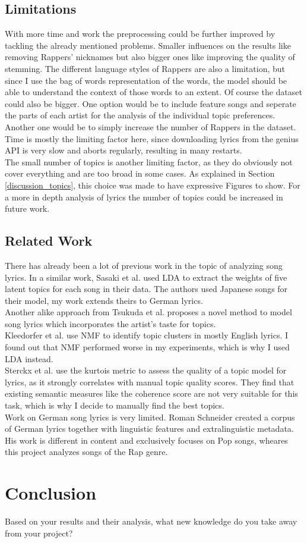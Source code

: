\documentclass[conference]{IEEEtran}
\begin{document}
\subsection{Limitations}
With more time and work the preprocessing could be further improved by tackling the already mentioned problems. Smaller influences on the results like removing Rappers' nicknames but also bigger ones like improving the quality of stemming. The different language styles of Rappers are also a limitation, but since I use the bag of words representation of the words, the model should be able to understand the context of those words to an extent. Of course the dataset could also be bigger. One option would be to include feature songs and seperate the parts of each artist for the analysis of the individual topic preferences. Another one would be to simply increase the number of Rappers in the dataset. Time is mostly the limiting factor here, since downloading lyrics from the genius API is very slow and aborts regularly, resulting in many restarts.\\
The small number of topics is another limiting factor, as they do obviously not cover everything and are too broad in some cases. As explained in Section \ref{discussion_topics}, this choice was made to have expressive Figures to show. For a more in depth analysis of lyrics the number of topics could be increased in future work.

\subsection{Related Work}
There has already been a lot of previous work in the topic of analyzing song lyrics. In a similar work, Sasaki et al. \cite{sasaki} used LDA to extract the weights of five latent topics for each song in their data. The authors used Japanese songs for their model, my work extends theirs to German lyrics.\\
Another alike approach from Tsukuda et al. \cite{tsukuda} proposes a novel method to model song lyrics which incorporates the artist's taste for topics.\\
Kleedorfer et al. \cite{kleedorfer} use NMF to identify topic clusters in mostly English lyrics. I found out that NMF performed worse in my experiments, which is why I used LDA instead.\\
Sterckx et al. \cite{sterckx} use the kurtois metric to assess the quality of a topic model for lyrics, as it strongly correlates with manual topic quality scores. They find that existing semantic measures like the coherence score are not very suitable for this task, which is why I decide to manually find the best topics.\\
Work on German song lyrics is very limited. Roman Schneider \cite{schneider} created a corpus of German lyrics together with linguistic features and extralinguistic metadata. His work is different in content and exclusively focuses on Pop songs, wheares this project analyzes songs of the Rap genre.

\section{Conclusion}
Based on your results and their analysis, what new knowledge do you
take away from your project?

{
\balance{
  
  
  }
}
\end{document}
